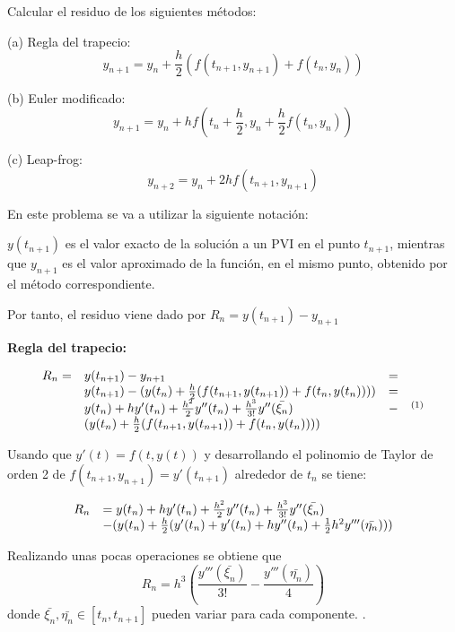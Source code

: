 \begin{mathproblem}{4}
Calcular el residuo de los siguientes métodos:

(a) Regla del trapecio:
$$y_{n+1}=y_n+\frac{h}{2}(f(t_{n+1},y_{n+1})+f(t_n, y_n))$$

(b) Euler modificado:
$$y_{n+1}=y_n+hf(t_n+\frac{h}{2}, y_n+\frac{h}{2}f(t_n, y_n))$$

(c) Leap-frog:
$$y_{n+2} = y_n + 2hf(t_{n+1}, y_{n+1})$$
\end{mathproblem}
En este problema se va a utilizar la siguiente notación: 

$y(t_{n+1})$ es el valor exacto de la solución a un PVI en el punto $t_{n+1}$, mientras que $y_{n+1}$ es el valor aproximado de la función, en el mismo punto, obtenido por el método correspondiente. 

Por tanto, el residuo viene dado por $R_n = y(t_{n+1}) - y_{n+1}$

\vspace{5mm}
\noindent\textbf{Regla del trapecio:}

\begin{equation*}
\begin{array}{l l l l}
R_n = & y(t_{n+1}) - y_{n+1} & = \\
 & y(t_{n+1}) - (y(t_n)+\frac{h}{2}(f(t_{n+1},y(t_{n+1}))+f(t_n, y(t_n)))) & = &\\
 & y(t_n)+hy'(t_n)+\frac{h^2}{2}y''(t_n)+\frac{h^3}{3!}y''(\bar{\xi_n}) & - & ^{(1)}\\ 
 & (y(t_n)+\frac{h}{2}(f(t_{n+1},y(t_{n+1}))+f(t_n, y(t_n)))) & & \\
\end{array}
\end{equation*}

Usando que $y'(t) = f(t, y(t))$ y desarrollando el polinomio de Taylor de orden 2 de $f(t_{n+1}, y_{n+1}) = y'(t_{n+1})$ alrededor de $t_n$ se tiene:

\begin{equation*}
\begin{array}{l l}
R_n & = y(t_n)+hy'(t_n)+\frac{h^2}{2}y''(t_n)+\frac{h^3}{3!}y''(\bar{\xi_n})\\
	& - (y(t_n) + \frac{h}{2}(y'(t_n) + y'(t_n) + hy''(t_n) + \frac{1}{2}h^2y'''(\bar{\eta_n})))\\
\end{array}
\end{equation*}

Realizando unas pocas operaciones se obtiene que
$$R_n = h^3\left(\frac{y'''(\bar{\xi_n})}{3!} - \frac{y'''(\bar{\eta_n})}{4}\right)$$
donde $\bar{\xi_n}, \bar{\eta_n} \in [t_n, t_{n+1}]$ pueden variar para cada componente.
.

